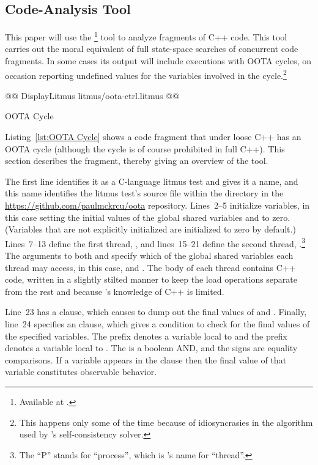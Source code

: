 \documentclass[10]{article}
\begin{document}
\subsection{Code-Analysis Tool}
\label{sec:Code-Analysis Tool}

This paper will use the \footnote{
	Available at .}
tool to analyze fragments of C++ code.
This tool carries out the moral equivalent of full state-space searches
of concurrent code fragments.
In some cases its output will include executions with OOTA cycles,
on occasion reporting undefined values for the variables involved in
the cycle.\footnote{
	This happens only some of the time because of idiosyncrasies
	in the algorithm used by 's self-consistency solver.}

\begin{listing}[tbp]
@@ DisplayLitmus litmus/oota-ctrl.litmus @@
\caption{OOTA Cycle}
\label{lst:OOTA Cycle}
\end{listing}

Listing~\ref{lst:OOTA Cycle}
shows a code fragment that under loose C++ has an OOTA cycle (although
the cycle is of course prohibited in full C++).
This section describes the fragment, thereby giving an overview of
the  tool.

The first line identifies it as a C-language litmus test and gives it
a name, and this name identifies the litmus test's source file within
the  directory in the \url{https://github.com/paulmckrcu/oota}
repository.
Lines~2--5 initialize variables, in this case setting the initial
values of the global shared variables  and  to zero.
(Variables that are not explicitly initialized are initialized
to zero by default.)
Lines~7--13 define the first thread, , and lines~15--21
define the second thread, .\footnote{
	The ``P'' stands for ``process'', which is 's name
	for ``thread''.}
The arguments to both  and  specify which of
the global shared variables each thread may access, in this case, 
and .
The body of each thread contains C++ code,
written in a slightly stilted manner to keep the load operations separate
from the rest and because 's knowledge of C++ is limited.

Line~23 has a  clause, which causes
 to dump out the final values of  and .
Finally, line~24 specifies an  clause, which gives a
condition to check for the final values of the specified variables.
The  prefix denotes a variable local to  and
the  prefix denotes a variable local to .
The \co{/\\} is a boolean AND, and the \co{=} signs are equality comparisons.
If a variable appears in the  clause then the final value of
that variable constitutes observable behavior.
\end{document}
